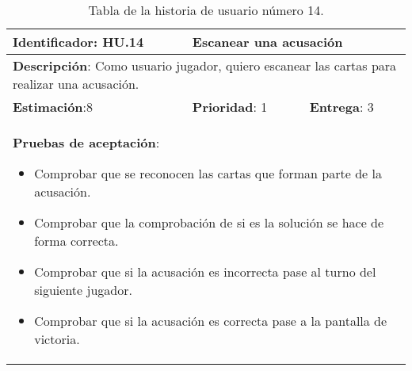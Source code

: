 \begin{table}[h]
  \begin{center}
    \begin{tabular}{|p{4cm}|p{4cm}|p{4cm}|}

    \hline
    \textbf{Identificador}: HU.14
    & \multicolumn{2}{p{8cm}|}{Escanear una acusación}\\

    \hline
    \multicolumn{3}{|p{12cm}|}{\textbf{Descripción}: Como usuario jugador, quiero escanear las cartas para realizar una acusación.}\\

    \hline
    \textbf{Estimación}:8
    & \textbf{Prioridad}: 1
    & \textbf{Entrega}: 3\\

    \hline
    \multicolumn{3}{|p{12cm}|}{\textbf{Pruebas de aceptación}:
      \begin{itemize}
        \item Comprobar que se reconocen las cartas que forman parte de la acusación.
        \item Comprobar que la comprobación de si es la solución se hace de forma correcta.
        \item Comprobar que si la acusación es incorrecta pase al turno del siguiente jugador.
        \item Comprobar que si la acusación es correcta pase a la pantalla de victoria.
      \end{itemize}
    }\\

    \hline

    \end{tabular}

    \caption{Tabla de la historia de usuario número 14.}
    \label{tabla-hu14}

  \end{center}
\end{table}

